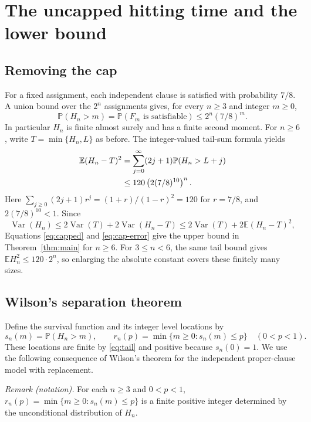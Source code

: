 \documentclass[11pt]{article}
\theoremstyle{remark}
\newcommand{\Prb}{\mathbb P}
\newcommand{\E}{\mathbb E}
\newcommand{\Var}{\operatorname{Var}}
\numberwithin{equation}{section}
\begin{document}
\section{The uncapped hitting time and the lower bound}
\label{sec:finish}

\subsection{Removing the cap}

For a fixed assignment, each independent clause is satisfied with
probability $7/8$. A union bound over the $2^n$ assignments gives,
for every $n\ge3$ and integer $m\ge0$,
\begin{equation}
 \Prb(H_n>m)=\Prb(F_m\text{ is satisfiable})
          \le2^n(7/8)^m.
 \label{eq:tail}
\end{equation}
In particular $H_n$ is finite almost surely and has a finite second
moment. For $n\ge6$, write $T=\min\{H_n,L\}$ as before. The
integer-valued tail-sum formula yields
\begin{align}
 \E(H_n-T)^2
 &=\sum_{j=0}^\infty(2j+1)\Prb(H_n>L+j)\notag\\
 &\le120\left(2(7/8)^{10}\right)^n.
 \label{eq:cap-error}
\end{align}
Here $\sum_{j\ge0}(2j+1)r^j=(1+r)/(1-r)^2=120$ for $r=7/8$,
and $2(7/8)^{10}<1$. Since
\[
 \Var(H_n)\le2\Var(T)+2\Var(H_n-T)
              \le2\Var(T)+2\E(H_n-T)^2,
\]
Equations \eqref{eq:capped} and \eqref{eq:cap-error} give the upper
bound in Theorem~\ref{thm:main} for $n\ge6$.
For $3\le n<6$, the same tail bound gives
$\E H_n^2\le120\cdot2^n$, so enlarging the absolute constant covers
these finitely many sizes.

\subsection{Wilson's separation theorem}

Define the survival function and its integer level locations by
\[
 s_n(m)=\Prb(H_n>m),\qquad
 r_n(p)=\min\{m\ge0:s_n(m)\le p\}\quad(0<p<1).
\]
These locations are finite by \eqref{eq:tail} and positive because
$s_n(0)=1$. We use the following consequence of Wilson's theorem
for the independent proper-clause model with replacement.

\noindent\textit{Remark (notation).} For each $n\ge3$ and $0<p<1$, $r_n(p)=\min\{m\ge0:s_n(m)\le p\}$ is a finite positive integer determined by the unconditional distribution of $H_n$.
\end{document}
